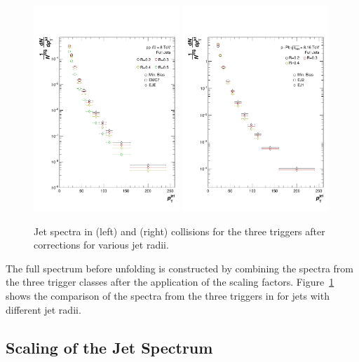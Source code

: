 \begin{figure}[hbt!]
    \centering
    \includegraphics[width=0.49\textwidth]{figures/CorrRawSpec/corrRawSpec.pdf}
    \includegraphics[width=0.49\textwidth]{figures/pPbFigures/CorrRawSpec/corrRawSpec.pdf}
    \caption{Jet spectra in \pp (left) and \pPb (right) collisions for the three triggers after corrections for various jet radii.}
    \label{fig:CorrRawSpec}
\end{figure}

The full spectrum before unfolding is constructed by combining the spectra from the three trigger classes after the application of the scaling factors. Figure~\ref{fig:CorrRawSpec} shows the comparison of the spectra from the three triggers in \pp for jets with different jet radii. 

\subsection{Scaling of the Jet Spectrum}
\label{sec:xsecNomalization}

